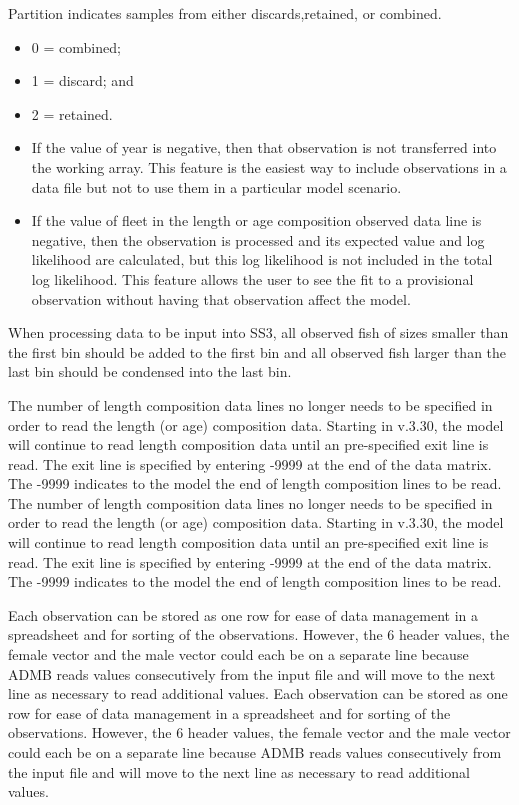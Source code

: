Partition indicates samples from either discards,retained, or combined.
	\begin{itemize}
		\item 0 = combined;
		\item 1 = discard; and
		\item 2 = retained.
	\end{itemize}

	\begin{itemize}
		\item If the value of year is negative, then that observation is not transferred into the working array. This feature is the easiest way to include observations in a data file but not to use them in a particular model scenario.
		\item If the value of fleet in the length or age composition observed data line is negative, then the observation is processed and its expected value and log likelihood are calculated, but this log likelihood is not included in the total log likelihood. This feature allows the user to see the fit to a provisional observation without having that observation affect the model.
	\end{itemize}

When processing data to be input into SS3, all observed fish of sizes smaller than the first bin should be added to the first bin and all observed fish larger than the last bin should be condensed into the last bin.	

The number of length composition data lines no longer needs to be specified in order to read the length (or age) composition data. Starting in v.3.30, the model will continue to read length composition data until an pre-specified exit line is read. The exit line is specified by entering -9999 at the end of the data matrix. The -9999 indicates to the model the end of length composition lines to be read.
The number of length composition data lines no longer needs to be specified in order to read the length (or age) composition data. Starting in v.3.30, the model will continue to read length composition data until an pre-specified exit line is read. The exit line is specified by entering -9999 at the end of the data matrix. The -9999 indicates to the model the end of length composition lines to be read.

Each observation can be stored as one row for ease of data management in a spreadsheet and for sorting of the observations. However, the 6 header values, the female vector and the male vector could each be on a separate line because ADMB reads values consecutively from the input file and will move to the next line as necessary to read additional values.
Each observation can be stored as one row for ease of data management in a spreadsheet and for sorting of the observations. However, the 6 header values, the female vector and the male vector could each be on a separate line because ADMB reads values consecutively from the input file and will move to the next line as necessary to read additional values.

